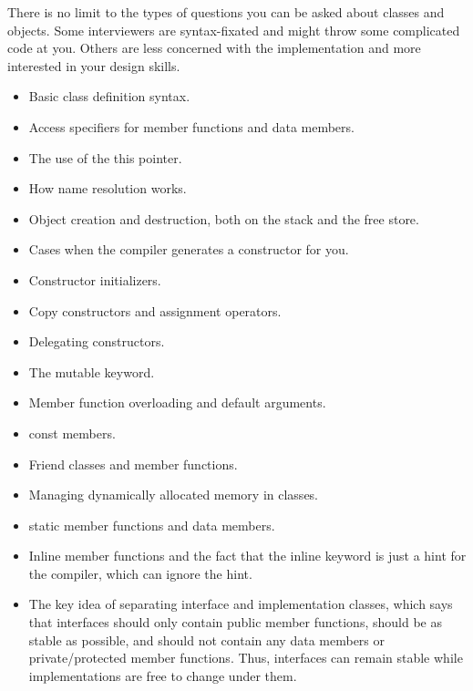 
There is no limit to the types of questions you can be asked about classes and objects. Some interviewers are syntax-fixated and might throw some complicated code at you. Others are less concerned with the implementation and more interested in your design skills.


\begin{itemize}
\item
Basic class definition syntax.

\item
Access specifiers for member functions and data members.

\item
The use of the this pointer.

\item
How name resolution works.

\item
Object creation and destruction, both on the stack and the free store.

\item
Cases when the compiler generates a constructor for you.

\item
Constructor initializers.

\item
Copy constructors and assignment operators.

\item
Delegating constructors.

\item
The mutable keyword.

\item
Member function overloading and default arguments.

\item
const members.

\item
Friend classes and member functions.

\item
Managing dynamically allocated memory in classes.

\item
static member functions and data members.

\item
Inline member functions and the fact that the inline keyword is just a hint for the compiler, which can ignore the hint.

\item
The key idea of separating interface and implementation classes, which says that interfaces should only contain public member functions, should be as stable as possible, and should not contain any data members or private/protected member functions. Thus, interfaces can remain stable while implementations are free to change under them.


\end{itemize}
